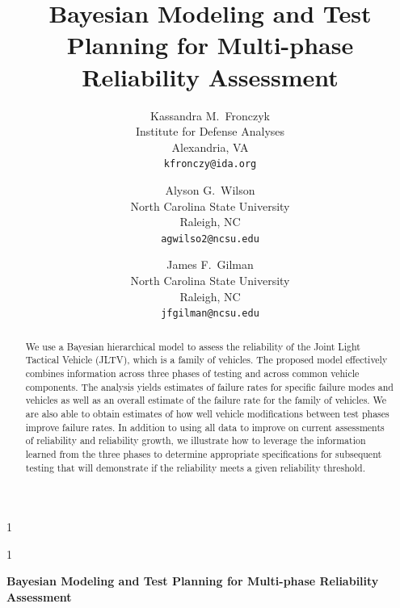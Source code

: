 \documentclass[12pt]{article}
\newcommand{\blind}{1}
\begin{document}
%

\def\spacingset#1{\renewcommand{\baselinestretch}%
{#1}\small\normalsize} \spacingset{1}



\blind
{
\title{Bayesian Modeling and Test Planning for Multi-phase Reliability Assessment}

\author{Kassandra M.\ Fronczyk\\Institute for Defense Analyses\\Alexandria, VA\\\texttt{kfronczy@ida.org} \and
Alyson G.\ Wilson\\North Carolina State University\\Raleigh, NC\\\texttt{agwilso2@ncsu.edu} \and
James F.\ Gilman\\North Carolina State University\\Raleigh, NC\\\texttt{jfgilman@ncsu.edu}
}
\maketitle} \fi

\blind
{
  \bigskip
  \bigskip
  \bigskip
  \begin{center}
    {\LARGE\bf Bayesian Modeling and Test Planning for Multi-phase Reliability Assessment}
\end{center}
  \medskip
} \fi

\bigskip

\begin{abstract}
    We use a Bayesian hierarchical model to assess the reliability of the Joint
    Light Tactical Vehicle (JLTV), which is a family of vehicles. The proposed
    model effectively combines information across three phases of testing and
    across common vehicle components. The analysis yields estimates of failure
    rates for specific failure modes and vehicles as well as an overall estimate
    of the failure rate for the family of vehicles. We are also able to obtain
    estimates of how well vehicle modifications between test phases improve
    failure rates. In addition to using all data to improve on current
    assessments of reliability and reliability growth, we illustrate how to
    leverage the information learned from the three phases to determine
    appropriate specifications for subsequent testing that will demonstrate if
    the reliability meets a given reliability threshold.
\end{abstract}
\end{document}
